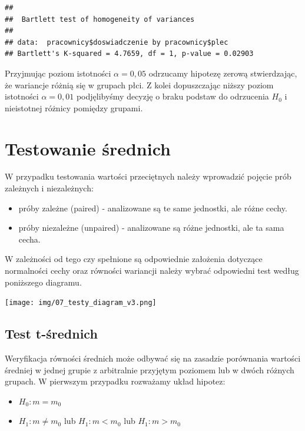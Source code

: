 \documentclass[
]{book}
\providecommand{\tightlist}{%
  \setlength{\itemsep}{0pt}\setlength{\parskip}{0pt}}
\begin{document}
\begin{verbatim}
## 
##  Bartlett test of homogeneity of variances
## 
## data:  pracownicy$doswiadczenie by pracownicy$plec
## Bartlett's K-squared = 4.7659, df = 1, p-value = 0.02903
\end{verbatim}

Przyjmując poziom istotności \(\alpha = 0,05\) odrzucamy hipotezę zerową stwierdzając, że wariancje różnią się w grupach płci. Z kolei dopuszczając niższy poziom istotności \(\alpha = 0,01\) podjęlibyśmy decyzję o braku podstaw do odrzucenia \(H_0\) i nieistotnej różnicy pomiędzy grupami.

\hypertarget{testowanie-ux15brednich}{%
\section{Testowanie średnich}\label{testowanie-ux15brednich}}

W przypadku testowania wartości przeciętnych należy wprowadzić pojęcie prób zależnych i niezależnych:

\begin{itemize}
\item
  próby zależne (paired) - analizowane są te same jednostki, ale różne cechy.
\item
  próby niezależne (unpaired) - analizowane są różne jednostki, ale ta sama cecha.
\end{itemize}

W zależności od tego czy spełnione są odpowiednie założenia dotyczące normalności cechy oraz równości wariancji należy wybrać odpowiedni test według poniższego diagramu.

\texttt{[image: img/07\_testy\_diagram\_v3.png]}

\hypertarget{test-t-ux15brednich}{%
\subsection{Test t-średnich}\label{test-t-ux15brednich}}

Weryfikacja równości średnich może odbywać się na zasadzie porównania wartości średniej w jednej grupie z arbitralnie przyjętym poziomem lub w dwóch różnych grupach. W pierwszym przypadku rozważamy układ hipotez:

\begin{itemize}
\tightlist
\item
  \(H_0: m = m_0\)
\item
  \(H_1: m \neq m_0\) lub \(H_1: m < m_0\) lub \(H_1: m > m_0\)
\end{itemize}
\end{document}
